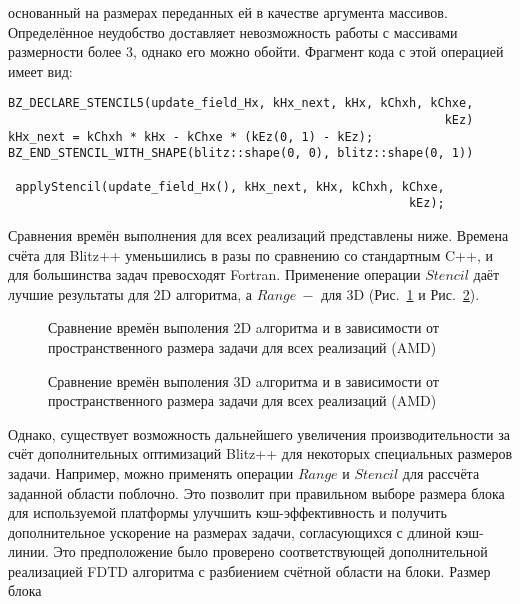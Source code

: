 \documentclass[10pt]{article}
\begin{document}
основанный на размерах переданных ей в качестве аргумента массивов. 
Определённое неудобство доставляет невозможность работы с массивами размерности
более 3, однако его можно обойти. Фрагмент кода с этой операцией имеет вид:\\
\begin{verbatim}
BZ_DECLARE_STENCIL5(update_field_Hx, kHx_next, kHx, kChxh, kChxe,
                                                             kEz)
kHx_next = kChxh * kHx - kChxe * (kEz(0, 1) - kEz);
BZ_END_STENCIL_WITH_SHAPE(blitz::shape(0, 0), blitz::shape(0, 1))
 
 applyStencil(update_field_Hx(), kHx_next, kHx, kChxh, kChxe,
                                                        kEz);
\end{verbatim}
Сравнения времён выполнения для всех реализаций представлены ниже.
Времена счёта для Blitz++ уменьшились в разы по сравнению со стандартным C++,
и для большинства задач превосходят Fortran. Применение операции $Stencil$
даёт лучшие результаты для 2D алгоритма, а $Range~-$
для 3D (Рис.~\ref{2D} и Рис.~\ref{3D}).
\newpage
\begin{figure}[h]
\begin{minipage}[h]{0.99\textwidth}
\end{minipage}
\caption{Сравнение времён выполения 2D aлгоритма и в зависимости 
  от пространственного размера задачи для всех реализаций (AMD)}
\label{2D}
\end{figure}
\begin{figure}[h]
\begin{minipage}[h]{0.99\textwidth}
\end{minipage}
\caption{Сравнение времён выполения 3D aлгоритма и в зависимости 
  от пространственного размера задачи для всех реализаций (AMD)}
\label{3D}
\end{figure}
\clearpage
Однако, существует возможность дальнейшего увеличения
производительности за счёт дополнительных оптимизаций Blitz++ для некоторых
специальных размеров задачи. Например, можно применять операции $Range$ и 
$Stencil$ для рассчёта заданной области поблочно. Это позволит при правильном 
выборе размера блока для используемой платформы улучшить кэш-эффективность и 
получить дополнительное ускорение на размерах задачи, согласующихся с длиной
кэш-линии. Это предположение было проверено соответствующей дополнительной 
реализацией FDTD алгоритма с разбиением счётной области на блоки. Размер блока 
\end{document}

